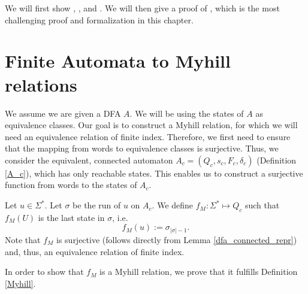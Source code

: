 We will first show , , and .
We will then give a proof of , which is the most challenging proof and formalization in this chapter.




\section{Finite Automata to Myhill relations}
We assume we are given a DFA $A$. 
We will be using the states of $A$ as equivalence classes.
Our goal is to construct a Myhill relation, for which we will need an equivalence relation of finite index.
Therefore, we first need to ensure that the mapping from words to equivalence classes is surjective.
Thus, we consider the equivalent, connected automaton $A_c=(Q_c, s_c, F_c, \delta_c)$ (Definition \ref{A_c}), which has only reachable states.
This enables us to construct a surjective function from words to the states of $A_c$.

\begin{definition}
    \label{f_M} 
    Let $u \in \Sigma^*$. 
    Let $\sigma$ be the run of $u$ on $A_c$. 
    We define $f_M: \Sigma^* \mapsto Q_c$ such that $f_M(U)$ is the last state in $\sigma$, i.e.
    \begin{equation*}
        f_M(u) := \sigma_{|\sigma|-1}.
    \end{equation*}
    Note that $f_M$ is surjective (follows directly from Lemma \ref{dfa_connected_repr}) 
    and, thus, an equivalence relation of finite index.
\end{definition}



In order to show that $f_M$ is a Myhill relation, we prove that it fulfills Definition \ref{Myhill}.

